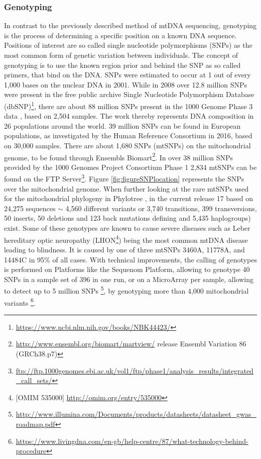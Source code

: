 \subsubsection{Genotyping}
In contrast to the previously described method of mtDNA sequencing, genotyping is the process of determining a specific position on a known DNA sequence. Positions of interest are so called single nucleotide polymorphisms (SNPs) as the most common form of genetic variation between individuals\cite{Perkel2008}. The concept of genotyping is to use the known region prior and behind the SNP as so called primers, that bind on the DNA. SNPs were estimated to occur at 1 out of every 1,000 bases on the nuclear DNA \cite{Syvanen2001} in 2001. While in 2008 over 12.8 million SNPs were present in the free public archive Single Nucleotide Polymorphism Database (dbSNP)\footnote{\url{https://www.ncbi.nlm.nih.gov/books/NBK44423/}}, there are about 88 million SNPs present in the 1000 Genome Phase 3 data \cite{Auton2015}, based on 2,504 samples. The work thereby represents DNA composition in 26 populations around the world. 39 million SNPs can be found in European populations, as investigated by the Human Reference Consortium \cite{McCarthy2016} in 2016, based on 30,000 samples. There are about 1,680 SNPs (mtSNPs) on the mitochondrial genome, to be found through Ensembls Biomart\footnote{\url{http://www.ensembl.org/biomart/martview/} release Ensembl Variation 86 (GRCh38.p7)}\cite{Flicek2014}. In over 38 million SNPs provided by the 1000 Genomes Project Consortium Phase 1 \cite{Abecasis2012} 2,834 mtSNPs can be found on the FTP Server\footnote{\url{ftp://ftp.1000genomes.ebi.ac.uk/vol1/ftp/phase1/analysis_results/integrated_call_sets/}}. Figure \ref{fig:figureSNPlocation} represents the SNPs over the mitochondrial genome. When further looking at the rare mtSNPs used for the mitochondrial phylogeny in Phylotree \cite{VanOven2009},\cite{VanOven2010} in the current release 17 based on 24,275 sequences $\sim$ 4,560 different variants or 3,740 transitions, 399 transversions, 50 inserts, 50 deletions and 123 back mutations defining and 5,435 haplogroups) exist. Some of these genotypes are known to cause severe diseases such as Leber hereditary optic neuropathy (LHON\footnote{[OMIM 535000] \url{http://omim.org/entry/535000}}) being the most common mtDNA disease leading to blindness. It is caused by one of three mtSNPs 3460A, 11778A, and 14484C in 95\% of all cases\cite{Elson2007}. With technical improvements, the calling of genotypes is performed on Platforms like the Sequenom Platform, allowing to genotype 40 SNPs in a sample set of 396 in one run\cite{Weissensteiner2013}, or on a MicroArray per sample, allowing to detect up to 5 million SNPs  \footnote{\url{http://www.illumina.com/Documents/products/datasheets/datasheet_gwas_roadmap.pdf}}, by genotyping more than 4,000 mitochondrial variants \footnote{\url{https://www.livingdna.com/en-gb/help-centre/87/what-technology-behind-procedure}}.


